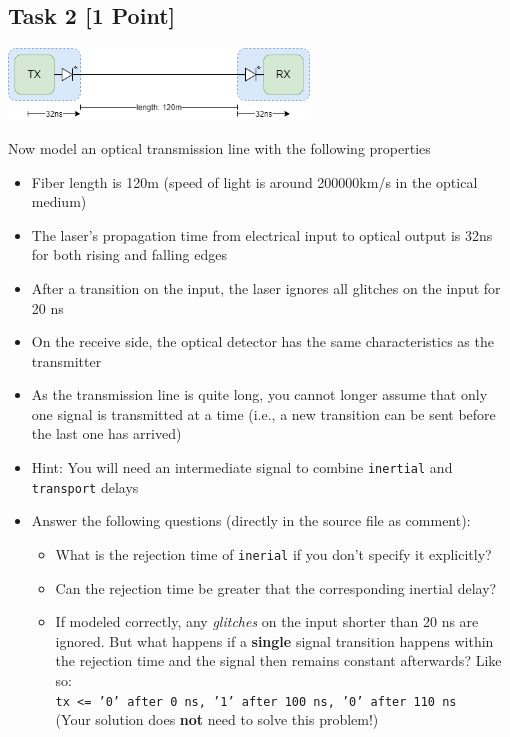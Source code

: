 \documentclass[12pt,epsf,makeidx,oneside]{book}
\begin{document}
\subsection{Task 2 [1 Point]}
\begin{center}
  \includegraphics[width=0.6\textwidth]{optical}
\end{center}
Now model an optical transmission line with the following properties
\begin{itemize}[noitemsep]
  \item Fiber length is 120m (speed of light is around 200000km/s in the optical medium)
  \item The laser's propagation time from electrical input to optical output is 32ns for both rising and falling edges
  \item After a transition on the input, the laser ignores all glitches on the input for 20 ns
  \item On the receive side, the optical detector has the same characteristics as the transmitter
  \item As the transmission line is quite long, you cannot longer assume that only one signal is transmitted at a time (i.e., a new transition can be sent before the last one has arrived)
  \item Hint: You will need an intermediate signal to combine {\tt inertial} and {\tt transport} delays
  \item Answer the following questions (directly in the source file as comment):
  \begin{itemize}[noitemsep]
    \item What is the rejection time of {\tt inerial} if you don't specify it explicitly?
    \item Can the rejection time be greater that the corresponding inertial delay?
    \item If modeled correctly, any \emph{glitches} on the input shorter than 20 ns are ignored. But what happens if a {\bf single} signal 
          transition happens within the rejection time and the signal then remains constant afterwards? Like so:\\
          {\tt tx <= '0' after 0 ns, '1' after 100 ns, '0' after 110 ns}\\
          (Your solution does {\bf not} need to solve this problem!)
  \end{itemize}
\end{itemize}
\end{document}
